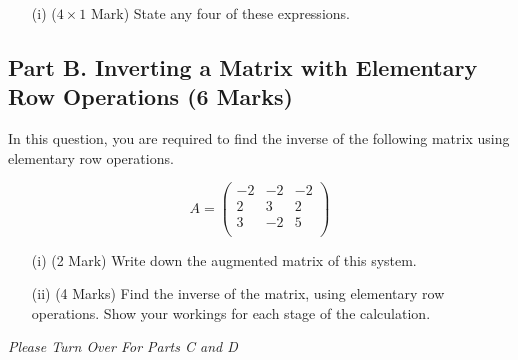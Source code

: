 \documentclass[a4paper,12pt]{article}
\begin{document}
	\begin{itemize}
		\item[(i)] ($4 \times 1$ Mark)
		State any four of these expressions.
	\end{itemize}
	
	\subsection*{Part B. Inverting a Matrix with Elementary Row Operations  (6 Marks)}	
In this question, you are required to find the inverse of the following matrix using elementary row operations.
	
	\begin{equation*}
	A=\left( \begin{array}{rrr}
-2  &  -2  &  -2\\
2  &  3  &  2\\
3  & -2  &  5\\
	\end{array} \right)
	\end{equation*}
	
	
			\begin{itemize}
				\item[(i)] (2 Mark) Write down the augmented matrix of this system. %
				
				
				\item[(ii)] (4 Marks) Find the inverse of the matrix, using elementary row operations. Show your workings for each stage of the calculation.
			\end{itemize}
			\medskip
		\noindent 	\textit{Please Turn Over For Parts C and D}
\newpage
\end{document}
